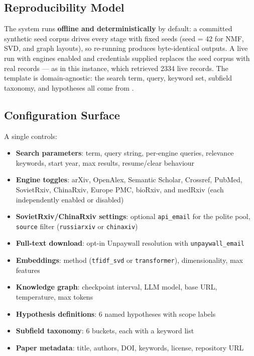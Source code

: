 \documentclass[
  english,
]{article}
\providecommand{\tightlist}{%
  \setlength{\itemsep}{0pt}\setlength{\parskip}{0pt}}
\begin{document}
\subsection{Reproducibility Model}\label{reproducibility-model}

The system runs \textbf{offline and deterministically} by default: a
committed synthetic seed corpus drives every stage with fixed seeds
(seed = 42 for NMF, SVD, and graph layouts), so re-running produces
byte-identical outputs. A live run with engines enabled and credentials
supplied replaces the seed corpus with real records --- as in this
instance, which retrieved 2334 live records. The template is
domain-agnostic: the search term, query, keyword set, subfield taxonomy,
and hypotheses all come from .

\subsection{Configuration Surface}\label{configuration-surface}

A single  controls:

\begin{itemize}
\tightlist
\item
  \textbf{Search parameters}: term, query string, per-engine queries,
  relevance keywords, start year, max results, resume/clear behaviour
\item
  \textbf{Engine toggles}: arXiv, OpenAlex, Semantic Scholar, Crossref,
  PubMed, SovietRxiv, ChinaRxiv, Europe PMC, bioRxiv, and medRxiv (each
  independently enabled or disabled)
\item
  \textbf{SovietRxiv/ChinaRxiv settings}: optional \texttt{api\_email}
  for the polite pool, \texttt{source} filter (\texttt{russiarxiv} or
  \texttt{chinaxiv})
\item
  \textbf{Full-text download}: opt-in Unpaywall resolution with
  \texttt{unpaywall\_email}
\item
  \textbf{Embeddings}: method (\texttt{tfidf\_svd} or
  \texttt{transformer}), dimensionality, max features
\item
  \textbf{Knowledge graph}: checkpoint interval, LLM model, base URL,
  temperature, max tokens
\item
  \textbf{Hypothesis definitions}: 6 named hypotheses with scope labels
\item
  \textbf{Subfield taxonomy}: 6 buckets, each with a keyword list
\item
  \textbf{Paper metadata}: title, authors, DOI, keywords, license,
  repository URL
\end{itemize}
\end{document}
